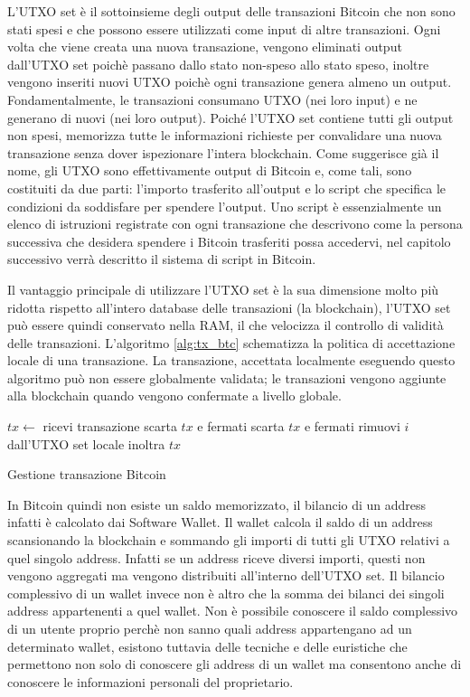 L'UTXO set è il sottoinsieme degli output delle transazioni Bitcoin che non sono stati spesi e che possono essere utilizzati come input di altre transazioni. Ogni volta che viene creata una nuova transazione, vengono eliminati output dall'UTXO set poichè passano dallo stato non-speso allo stato speso, inoltre vengono inseriti nuovi UTXO poichè ogni transazione genera almeno un output. Fondamentalmente, le transazioni consumano UTXO (nei loro input) e ne generano di nuovi (nei loro output). Poiché l'UTXO set contiene tutti gli output non spesi, memorizza tutte le informazioni richieste per convalidare una nuova transazione senza dover ispezionare l'intera blockchain. Come suggerisce già il nome, gli UTXO sono effettivamente output di Bitcoin e, come tali, sono costituiti da due parti: l'importo trasferito all'output e lo script che specifica le condizioni da soddisfare per spendere l'output. Uno script è essenzialmente un elenco di istruzioni registrate con ogni transazione che descrivono come la persona successiva che desidera spendere i Bitcoin trasferiti possa accedervi, nel capitolo successivo verrà descritto il sistema di script in Bitcoin.

Il vantaggio principale di utilizzare l'UTXO set è la sua dimensione molto più ridotta rispetto all'intero database delle transazioni (la blockchain), l'UTXO set può essere quindi conservato nella RAM, il che velocizza il controllo di validità delle transazioni. L'algoritmo \ref{alg:tx_btc} schematizza la politica di accettazione locale di una transazione. La transazione, accettata localmente eseguendo questo algoritmo può non essere globalmente validata; le transazioni vengono aggiunte alla blockchain quando vengono confermate a livello globale.
\begin{algorithm}
\begin{algorithmic}
\State $tx \gets$ ricevi transazione
        \State scarta $tx$ e fermati
    \EndIf
\EndFor
{}
    \State scarta $tx$ e fermati
\EndIf
{}
    \State rimuovi $i$ dall'UTXO set locale
\EndFor
\State inoltra $tx$
\end{algorithmic}
\caption{Gestione transazione Bitcoin}
\label{alg:tx_btc}
\end{algorithm}
\FloatBarrier
In Bitcoin quindi non esiste un saldo memorizzato, il bilancio di un address infatti è calcolato dai Software Wallet. Il wallet calcola il saldo di un address scansionando la blockchain e sommando gli importi di tutti gli UTXO relativi a quel singolo address. Infatti se un address riceve diversi importi, questi non vengono aggregati ma vengono distribuiti all'interno dell'UTXO set. Il bilancio complessivo di un wallet invece non è altro che la somma dei bilanci dei singoli address appartenenti a quel wallet. 
Non è possibile conoscere il saldo complessivo di un utente proprio perchè non sanno quali address appartengano ad un determinato wallet, esistono tuttavia delle tecniche e delle euristiche che permettono non solo di conoscere gli address di un wallet ma consentono anche di conoscere le informazioni personali del proprietario.

